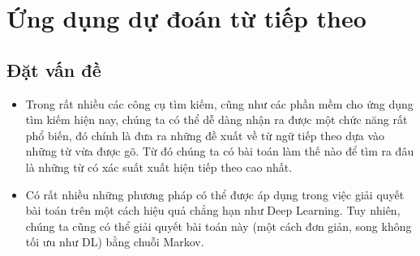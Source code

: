 \chapter{Ứng dụng dự đoán từ tiếp theo}

\section{Đặt vấn đề}
\begin{itemize}
    \item Trong rất nhiều các công cụ tìm kiếm, cũng như các phần mềm cho ứng dụng tìm kiếm hiện nay, chúng ta có thể dễ dàng nhận ra được một chức năng rất phổ biến, đó chính là đưa ra những đề xuất về từ ngữ tiếp theo dựa vào những từ vừa được gõ. Từ đó chúng ta có bài toán làm thế nào để tìm ra đâu là những từ có xác suất xuất hiện tiếp theo cao nhất.
    \item Có rất nhiều những phương pháp có thể được áp dụng trong việc giải quyết bài toán trên một cách hiệu quả chẳng hạn như Deep Learning. Tuy nhiên, chúng ta cũng có thể giải quyết bài toán này (một cách đơn giản, song không tối ưu như DL) bằng chuỗi Markov.
\end{itemize}

